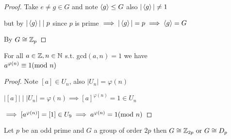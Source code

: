 \begin{proof}
    Take $e\neq g \in G$ and note $\left\langle g \right\rangle\leq G$ also $|\left\langle g \right\rangle|\neq 1$

    but by  $|\left\langle g \right\rangle| \mid p$ since $p$ is prime $\implies |\left\langle g \right\rangle|=p \implies \left\langle g \right\rangle=G$

    By  $G \cong \mathbb{Z}_p$
\end{proof}

\begin{corollary}
    For all $a\in \mathbb{Z}, n\in\mathbb{N}$ s.t. gcd$(a,n)=1$ we have\\
    $a^{\varphi(n)}\equiv 1 (\text{mod }n)$
\end{corollary}

\begin{proof}
    Note $[a]\in U_n$, also $|U_n|=\varphi(n)$

    $|[a]| \mid |U_n|=\varphi(n) \implies [a]^{\varphi(n)}=1\in U_n$
    
    $\implies [a^{\varphi(n)}]=[1]\in U_9 \implies a^{\varphi(n)}=1 (\text{mod }n)$
\end{proof}

\newpage
\begin{theorem}
    Let $p$ be an odd prime and $G$ a group of order $2p$ then $G \cong \mathbb{Z}_{2p} \text{ or } G \cong D_p$
\end{theorem}


